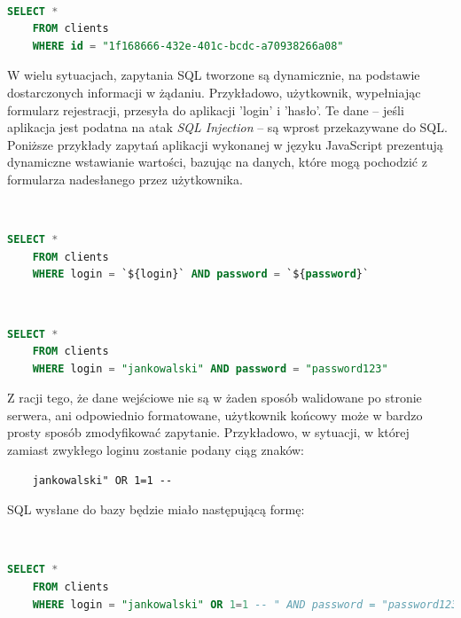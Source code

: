 \documentclass[12pt,twoside]{article}
\begin{document}
\

\begin{lstlisting}[language=SQL,caption=Zwrócenie rekordu o podanym identyfikatorze z tabeli 'clients',label={KodSQL1}]
	SELECT * 
	FROM clients
	WHERE id = "1f168666-432e-401c-bcdc-a70938266a08"
\end{lstlisting}

W wielu sytuacjach, zapytania SQL tworzone są dynamicznie, na podstawie dostarczonych informacji w żądaniu. Przykładowo, użytkownik, wypełniając formularz rejestracji, przesyła do aplikacji 'login' i 'hasło'. Te dane -- jeśli aplikacja jest podatna na atak \emph{SQL Injection} -- są wprost przekazywane do SQL. Poniższe przykłady zapytań aplikacji wykonanej w języku JavaScript prezentują dynamiczne wstawianie wartości, bazując na danych, które mogą pochodzić z formularza nadesłanego przez użytkownika.

\

\begin{lstlisting}[language=SQL,caption=Kod źródłowy zapytania z selekcją na podstawie danych od użytkownika,label={KodSQL2}]
	SELECT * 
	FROM clients
	WHERE login = `${login}` AND password = `${password}`
\end{lstlisting}

\

\begin{lstlisting}[language=SQL,caption=Zapytanie SQL po wprowadzeniu danych,label={KodSQL3}]
	SELECT * 
	FROM clients
	WHERE login = "jankowalski" AND password = "password123"
\end{lstlisting}

Z racji tego, że dane wejściowe nie są w żaden sposób walidowane po stronie serwera, ani odpowiednio formatowane, użytkownik końcowy może w bardzo prosty sposób zmodyfikować zapytanie. Przykładowo, w sytuacji, w której zamiast zwykłego loginu zostanie podany ciąg znaków: 

\begin{verbatim}
	jankowalski" OR 1=1 --
\end{verbatim}

SQL wysłane do bazy będzie miało następującą formę:

\

\begin{lstlisting}[language=SQL,caption=Zapytanie wysyłane do bazy po wprowadzeniu zmodyfikowanych danych,label={KodSQL4}]
	SELECT * 
	FROM clients
	WHERE login = "jankowalski" OR 1=1 -- " AND password = "password123"
\end{lstlisting}
\end{document}
